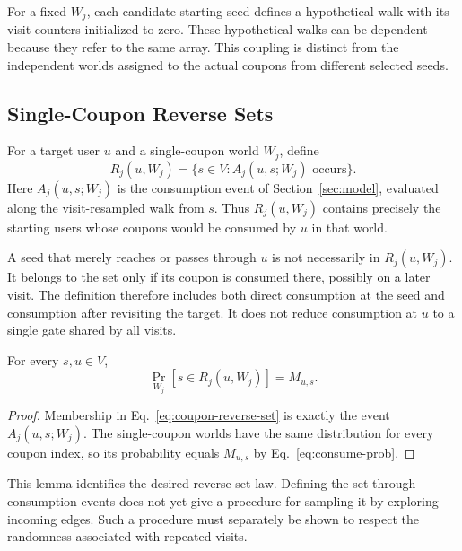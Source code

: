 \documentclass[sigconf]{acmart}
\begin{document}
For a fixed $W_j$, each candidate starting seed defines a hypothetical
walk with its visit counters initialized to zero. These hypothetical
walks can be dependent because they refer to the same array. This
coupling is distinct from the independent worlds assigned to the
actual coupons from different selected seeds.

\subsection{Single-Coupon Reverse Sets}
\label{sec:single-reverse}

\begin{definition}
For a target user $u$ and a single-coupon world $W_j$, define
\begin{equation}
\label{eq:coupon-reverse-set}
  R_j(u,W_j)=\{s\in V:A_j(u,s;W_j)\text{ occurs}\}.
\end{equation}
Here $A_j(u,s;W_j)$ is the consumption event of
Section~\ref{sec:model}, evaluated along the visit-resampled walk
from $s$. Thus $R_j(u,W_j)$ contains precisely the starting users
whose coupons would be consumed by $u$ in that world.
\end{definition}

A seed that merely reaches or passes through $u$ is not necessarily
in $R_j(u,W_j)$. It belongs to the set only if its coupon is consumed
there, possibly on a later visit. The definition therefore includes
both direct consumption at the seed and consumption after revisiting
the target. It does not reduce consumption at $u$ to a single gate
shared by all visits.

\begin{lemma}
\label{lem:coverage}
For every $s,u\in V$,
\begin{equation}
\label{eq:single-reverse-law}
  \Pr_{W_j}[s\in R_j(u,W_j)]=M_{u,s}.
\end{equation}
\end{lemma}

\begin{proof}
Membership in Eq.~\eqref{eq:coupon-reverse-set} is exactly the event
$A_j(u,s;W_j)$. The single-coupon worlds have the same distribution
for every coupon index, so its probability equals $M_{u,s}$ by
Eq.~\eqref{eq:consume-prob}.
\end{proof}

This lemma identifies the desired reverse-set law. Defining the set
through consumption events does not yet give a procedure for sampling
it by exploring incoming edges. Such a procedure must separately be
shown to respect the randomness associated with repeated visits.
\end{document}
